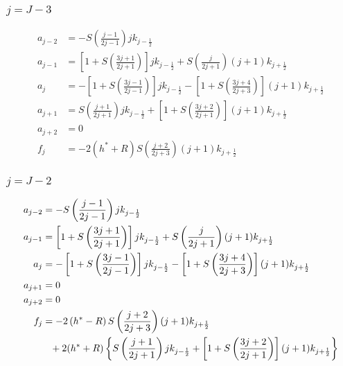 \documentclass[12pt]{article}
\numberwithin{equation}{section}
\begin{document}
\subsubsection{$j = J-3$}

\begin{align}
	a_{j-2}
	&=
	-S\left( \frac{j-1}{2j - 1} \right) j k_{j-\frac{1}{2}}
	\\
	a_{j-1}
	&=
	\left[
		1 + S \left(\frac{3j+1}{2j + 1}\right)
	\right] jk_{j-\frac{1}{2}}
	+
	S \left(
		\frac{j}{2j + 1}
	\right) (j+1) k_{j+\frac{1}{2}}
	\\
	a_{j}
	&=
	-  \left[
		1 + S \left( \frac{3j - 1}{2j - 1} \right)
	\right]
	j k_{j-\frac{1}{2}}
	-
	\left[
		1 + S\left( \frac{3j + 4}{2j + 3} \right)
	\right](j+1) k_{j+\frac{1}{2}}
	\\
	a_{j+1}
	&=
	S\left(
		\frac{j + 1}{2j + 1} 
	\right) jk_{j-\frac{1}{2}}
	+
	\left[
		1 + S \left( \frac{3j+2}{2j + 1} \right)
	\right] (j+1)k_{j+\frac{1}{2}}
	\\
	a_{j+2}
	&=
	0
	\\
	f_j 
	&=
	-2\left(
		h^* + R
	\right)
	S
	\left(
		\frac{j+2}{2j +3} 
	\right)(j+1)k_{j+\frac{1}{2}}
\end{align}


\subsubsection{$j = J-2$}

\begin{align}
	a_{j-2}
	&=
	-S\left( \frac{j-1}{2j - 1} \right) j k_{j-\frac{1}{2}}
	\\
	a_{j-1}
	&=
	\left[
		1 + S \left(\frac{3j+1}{2j + 1}\right)
	\right] jk_{j-\frac{1}{2}}
	+
	S \left(
		\frac{j}{2j + 1}
	\right) (j+1) k_{j+\frac{1}{2}}
	\\
	a_{j}
	&=
	-  \left[
		1 + S \left( \frac{3j - 1}{2j - 1} \right)
	\right]
	j k_{j-\frac{1}{2}}
	-
	\left[
		1 + S\left( \frac{3j + 4}{2j + 3} \right)
	\right](j+1) k_{j+\frac{1}{2}}
	\\
	a_{j+1}
	&=
	0
	\\
	a_{j+2}
	&=
	0
	\\
	f_j 
	&=
	-2\left(
		h^* - R
	\right)
	S
	\left(
		\frac{j+2}{2j +3} 
	\right)(j+1)k_{j+\frac{1}{2}}
	\nonumber \\ & \hphantom{=}+
	2 (h^* + R)
	\left\{
		S\left(
		\frac{j + 1}{2j + 1} 
	\right) jk_{j-\frac{1}{2}}
	+
	\left[
		1 + S \left( \frac{3j+2}{2j + 1} \right)
	\right] (j+1)k_{j+\frac{1}{2}}
	\right\}
\end{align}
\end{document}
